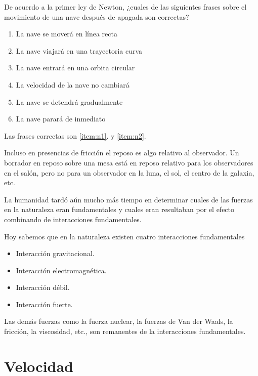 \ejemplo{}
\begin{frame}
  De acuerdo a la primer ley de Newton, ¿cuales de las siguientes frases sobre el movimiento de una nave después de apagada son correctas?
  \begin{enumerate}
  \item La nave se moverá en línea recta
    \label{item:n1}
  \item La nave viajará en una trayectoria curva
  \item La nave entrará en una orbita circular
  \item La velocidad de la nave no cambiará
    \label{item:n2}
  \item La nave se detendrá gradualmente
  \item La nave parará de inmediato
  \end{enumerate}
\end{frame}

Las frases correctas son  \ref{item:n1}. y \ref{item:n2}.\finejemplo

Incluso en presencias de fricción el reposo es algo relativo al observador. Un borrador en reposo sobre una mesa está en reposo relativo para los observadores en el salón, pero no para un observador en la luna, el sol, el centro de la galaxia, etc.


La humanidad tardó aún mucho más tiempo en determinar cuales de las fuerzas en la naturaleza eran fundamentales y cuales eran resultaban por el efecto combinando de interacciones fundamentales.

Hoy sabemos que en la naturaleza existen cuatro interacciones fundamentales
\begin{itemize}
\item Interacción gravitacional.
\item Interacción electromagnética.
\item Interacción débil.
\item Interacción fuerte.
\end{itemize}

Las demás fuerzas como la fuerza nuclear, la fuerzas de Van der Waals, la fricción, la viscosidad, etc., son remanentes de la interacciones fundamentales. 


\section{Velocidad}

